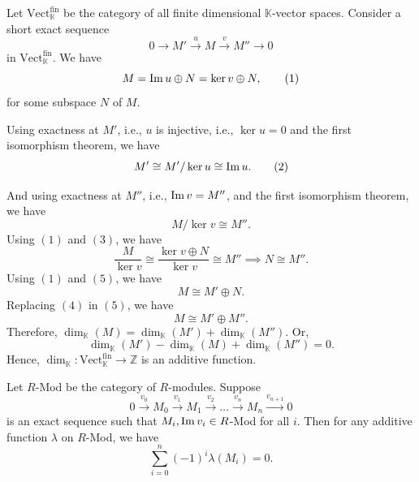 \begin{example}
    Let \(\mathrm{Vect}^{\mathrm{fin}}_\mathbb{K}\) be the category of all finite dimensional \( \mathbb{K}\)-vector spaces.
Consider a short exact sequence
\[
0 \to M'
\xrightarrow{\,u\,}
M
\xrightarrow{\,v\,}
M''
\to 0
\]
in \(\mathrm{Vect}^{\mathrm{fin}}_\mathbb{K}\). We have 
\[
    M = \operatorname{Im} u \oplus N = \ker v \oplus N,\tag{1}
\] 
for some subspace \( N \) of \( M \).

Using exactness at \( M' \), i.e., \( u \) is injective, i.e.,  \( \ker u = 0 \) and the first isomorphism theorem, we have
\[
    M' \cong M' / \ker u \cong \operatorname{Im} u.\tag{2}
\]

And using exactness at \( M'' \), i.e.,  \( \operatorname{Im} v = M'' \), and the first isomorphism theorem, we have
\[
    M / \ker v \cong M''.\tag{3}
\]
Using \( (1) \) and  \( (3) \), we have
 \[
     \frac{M}{\ker v} \cong \frac{\ker v \oplus N}{\ker v} \cong M'' \implies N \cong M''.\tag{4}
\]
Using \( (1) \) and  \( (5) \), we have 
 \[
    M \cong M' \oplus N.\tag{5}
\] 
Replacing \( (4) \) in  \( (5) \), we have 
 \[
    M \cong M' \oplus M''.
\]
Therefore, \( \operatorname{dim}_{\mathbb{K}}(M) = \operatorname{dim}_{\mathbb{K}}(M') + \operatorname{dim}_{\mathbb{K}}(M'') \). Or,
 \[
    \operatorname{dim}_{\mathbb{K}}(M') - \operatorname{dim}_{\mathbb{K}}(M) + \operatorname{dim}_{\mathbb{K}}(M'') = 0.
\]
Hence, \( \operatorname{dim}_{\mathbb{K}}:  \mathrm{Vect}^{\mathrm{fin}}_\mathbb{K} \to \mathbb{Z}\) is an additive function.
\end{example}
\begin{proposition}
    Let \( R \)-Mod be the category of \( R \)-modules. Suppose
    \[
        0 \xrightarrow{v_0} M_0 \xrightarrow{v_1} M_1 \xrightarrow{v_2} \ldots \xrightarrow{v_n} M_n \xrightarrow{v_{n+1}} 0
    \] 
    is an exact sequence such that \( M_i, \operatorname{Im} v_i \in R \)-Mod for all \( i \). Then for any additive function \( \lambda \) on  \( R\)-Mod, we have 
    \[
        \sum_{i = 0}^n (-1)^i \lambda(M_i) = 0.
    \] 
\end{proposition}
